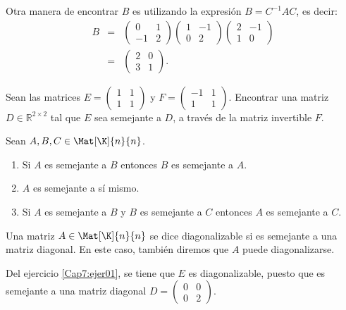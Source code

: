 \documentclass[compacto,10pt]{pubciencias-notas}
\begin{document}
\begin{ejem}
Otra manera de encontrar $B$ es utilizando la expresión $B=C^{-1}AC$, es decir:
\begin{eqnarray*}
B&=&\begin{pmatrix} 0 & 1 \\ -1 & 2 \end{pmatrix}
\begin{pmatrix} 1 & -1 \\ 0 & 2 \end{pmatrix}
\begin{pmatrix} 2 & -1 \\ 1 & 0 \end{pmatrix}\\
&=&\begin{pmatrix} 2 & 0 \\ 3 & 1 \end{pmatrix}.
\end{eqnarray*}
\end{ejem}
\begin{ejer}\label{Cap7:ejer01} 
Sean las matrices $E = \begin{pmatrix} 1 & 1 \\ 1 & 1 \end{pmatrix}$ y $F = \begin{pmatrix} -1 & 1 \\ 1 & 1 \end{pmatrix}$. Encontrar una matriz $D\in\mathbb{R}^{2\times 2}$  tal que $E$ sea semejante a $D$, a través de la matriz invertible $F$.
\end{ejer}
\begin{teo}
Sean $A,B, C \in \Mat[\K]{n}{n}$.
\begin{enumerate}
    \item Si $A$ es semejante a $B$ entonces $B$ es semejante a $A$.
    \item $A$ es semejante a sí mismo.
    \item Si $A$ es semejante a $B$  y $B$ es semejante a $C$ entonces $A$ es semejante a $C$.  
\end{enumerate}
\end{teo}
\begin{defi}
Una matriz $A\in\Mat[\K]{n}{n}$ se dice diagonalizable si es semejante a una matriz diagonal. En este caso, también diremos que $A$ puede diagonalizarse.
\end{defi}
\begin{ejem}
Del ejercicio \ref{Cap7:ejer01}, se tiene que $E$ es diagonalizable, puesto que es semejante a una matriz diagonal $D=\begin{pmatrix} 0 & 0 \\ 0 & 2 \end{pmatrix}$.
\end{ejem}
\end{document}
